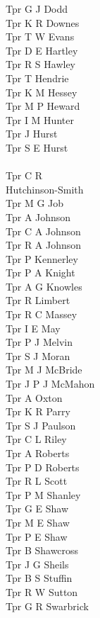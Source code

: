 \begin{multicols}{3}
  Tpr G J Dodd \\
  Tpr K R Downes \\
  Tpr T W Evans \\
  Tpr D E Hartley \\
  Tpr R S Hawley \\
  Tpr T Hendrie \\
  Tpr K M Hessey \\
  Tpr M P Heward \\
  Tpr I M Hunter \\
  Tpr J Hurst \\
  Tpr S E Hurst \\
  \\ Tpr C R \\ \indent Hutchinson-Smith \\
  Tpr M G Job \\
  Tpr A Johnson \\
  Tpr C A Johnson \\
  Tpr R A Johnson \\
  Tpr P Kennerley \\
  Tpr P A Knight \\
  Tpr A G Knowles \\
  Tpr R Limbert \\
  Tpr R C Massey \\
  Tpr I E May \\
  Tpr P J Melvin \\
  Tpr S J Moran \\
  Tpr M J McBride \\
  Tpr J P J McMahon \\
  Tpr A Oxton \\
  Tpr K R Parry \\
  Tpr S J Paulson \\
  Tpr C L Riley \\
  Tpr A Roberts \\
  Tpr P D Roberts \\
  Tpr R L Scott \\
  Tpr P M Shanley \\
  Tpr G E Shaw \\
  Tpr M E Shaw \\
  Tpr P E Shaw \\
  Tpr B Shawcross \\
  Tpr J G Sheils \\
  Tpr B S Stuffin \\
  Tpr R W Sutton \\
  Tpr G R Swarbrick \\

\end{multicols}
